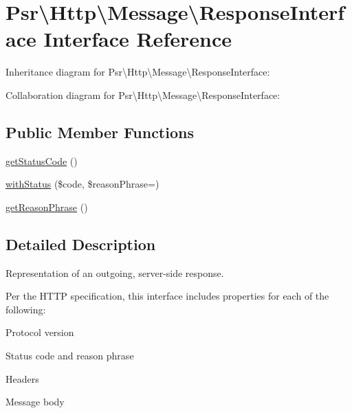 \hypertarget{interfacePsr_1_1Http_1_1Message_1_1ResponseInterface}{}\section{Psr\textbackslash{}Http\textbackslash{}Message\textbackslash{}Response\+Interface Interface Reference}
\label{interfacePsr_1_1Http_1_1Message_1_1ResponseInterface}


Inheritance diagram for Psr\textbackslash{}Http\textbackslash{}Message\textbackslash{}Response\+Interface\+:


Collaboration diagram for Psr\textbackslash{}Http\textbackslash{}Message\textbackslash{}Response\+Interface\+:
\subsection*{Public Member Functions}
\begin{DoxyCompactItemize}
\item 
\hyperlink{interfacePsr_1_1Http_1_1Message_1_1ResponseInterface_a599198ec3cc30dc374da26e504c65868}{get\+Status\+Code} ()
\item 
\hyperlink{interfacePsr_1_1Http_1_1Message_1_1ResponseInterface_ae79c87a0cd82e000a5e1bb4dbee739da}{with\+Status} (\$code, \$reason\+Phrase=\textquotesingle{}\textquotesingle{})
\item 
\hyperlink{interfacePsr_1_1Http_1_1Message_1_1ResponseInterface_a98ae6592ab231946a767d9b422142a26}{get\+Reason\+Phrase} ()
\end{DoxyCompactItemize}


\subsection{Detailed Description}
Representation of an outgoing, server-\/side response.

Per the H\+T\+TP specification, this interface includes properties for each of the following\+:


\begin{DoxyItemize}
\item Protocol version
\item Status code and reason phrase
\item Headers
\item Message body
\end{DoxyItemize}

